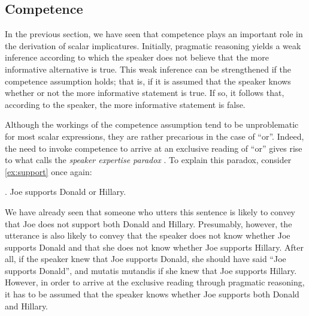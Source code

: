 \documentclass[12pt]{article}
\begin{document}
\subsection*{Competence}

In the previous section, we have seen that competence plays an important role in the derivation of scalar implicatures. Initially, pragmatic reasoning yields a weak inference according to which the speaker does not believe that the more informative alternative is true. This weak inference can be strengthened if the competence assumption holds; that is, if it is assumed that the speaker knows whether or not the more informative statement is true. If so, it follows that, according to the speaker, the more informative statement is false.

Although the workings of the competence assumption tend to be unproblematic for most scalar expressions, they are rather precarious in the case of ``or''. Indeed, the need to invoke competence to arrive at an exclusive reading of ``or'' gives rise to what \citet{zondervan2010} calls the \emph{speaker expertise paradox} \citep[cf.][]{geurts2006}. To explain this paradox, consider \ref{ex:support} once again:

\ex.	Joe supports Donald or Hillary.

We have already seen that someone who utters this sentence is likely to convey that Joe does not support
both Donald and Hillary. Presumably, however, the utterance is also likely to convey that the speaker does not know whether
Joe supports Donald and that she does not know whether Joe supports Hillary. After all, if the speaker knew that Joe supports Donald, she should have said ``Joe supports Donald'', and mutatis mutandis if she knew that Joe supports Hillary. However, in order to arrive at the exclusive reading through pragmatic reasoning, it has to be assumed that the
speaker knows whether Joe supports both Donald and Hillary. 
\end{document}
